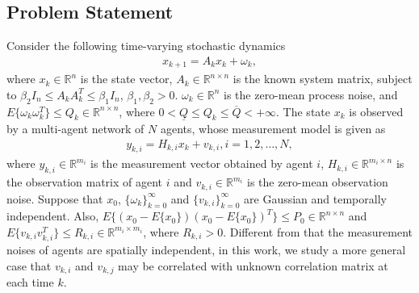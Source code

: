 \documentclass[journal,transmag]{IEEEtran}
\begin{document}
	\subsection{Problem Statement}
	Consider the following time-varying stochastic dynamics
	\begin{align}\label{system_all}
	x_{k+1}=A_{k}x_{k}+\omega_{k},
	\end{align}
	where $x_{k}\in\mathbb{R}^{n}$ is the state vector,
	$A_{k}\in\mathbb{R}^{n\times n}$ is the known system matrix, subject to $\beta_{2}I_n\leq A_{k}A_{k}^T\leq\beta_{1}I_n$, $\beta_1,\beta_2>0$. $\omega_{k}\in\mathbb{R}^{n}$ is the zero-mean process noise, and $E\{\omega_{k}\omega_{k}^T\}\leq Q_{k}\in\mathbb{R}^{n\times n}$, where $0<\underline Q\leq Q_{k}\leq \overline Q<+\infty$. The state $x_{k}$ is observed by a multi-agent network of $N$ agents, whose measurement model is given as
	\begin{align}\label{system_all1}
	y_{k,i}=H_{k,i}x_{k}+v_{k,i},i=1,2,\ldots,N,
	\end{align}
	where $y_{k,i}\in\mathbb{R}^{m_i}$ is the measurement vector obtained by agent $i$,  $H_{k,i}\in\mathbb{R}^{m_i\times n}$ is the observation matrix of agent $i$ and $v_{k,i}\in\mathbb{R}^{m_i}$ is the zero-mean observation noise.
	{Suppose that $x_{0}$, $\{\omega_{k}\}_{k=0}^{\infty}$ and $\{v_{k,i}\}_{k=0}^{\infty}$ are Gaussian and temporally independent. 
	Also, $E\{(x_{0}-E\{x_{0}\})(x_{0}-E\{x_{0}\})^T\}\leq P_{0}\in\mathbb{R}^{n\times n}$ and $E\{v_{k,i}v_{k,i}^T\}\leq R_{k,i}\in\mathbb{R}^{m_i\times m_i}$,  where  $R_{k,i}>0$.
	Different from \cite{wang2017convergence,cattivelli2010diffusion,olfati2009kalman,Dm2015Distributed} that the measurement noises of agents are spatially independent, in this work, we study a more general case that  $v_{k,i}$ and $v_{k,j}$ may be correlated  with unknown correlation matrix at each time  $k$.
}
	
	
	
\end{document}
